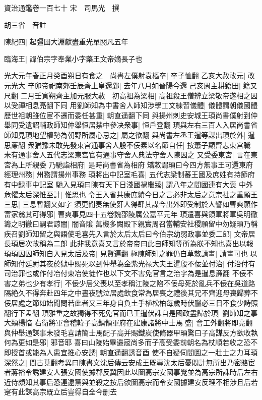 資治通鑑卷一百七十
宋　司馬光　撰

胡三省　音註

陳紀四|{
	起彊圉大淵獻盡重光單閼凡五年}


臨海王|{
	諱伯宗字奉業小字藥王文帝嫡長子也}


光大元年春正月癸酉朔日有食之　尚書左僕射袁樞卒|{
	卒子恤翻}
乙亥大赦改元|{
	改元光大}
辛卯帝祀南郊壬辰齊上皇還鄴|{
	去年八月如晉陽今還}
己亥周主耕籍田|{
	籍又尺翻}
二月壬寅朔齊主加元服大赦　初高祖為梁相|{
	高祖殺王僧辨立梁敬帝遂相之因以受禪相息亮翻下同}
用劉師知為中書舍人師知涉學工文練習儀體|{
	儀體謂朝儀國體}
歷世祖朝雖位宦不遷而委任甚重|{
	朝直遥翻下同}
與揚州刺史安城王頊尚書僕射到仲舉同受遺詔輔政師知仲舉恒居禁中參决衆事|{
	恒戶登翻}
頊與左右三百人入居尚書省師知見頊地望權勢為朝野所屬心忌之|{
	屬之欲翻}
與尚書左丞王暹等謀出頊於外|{
	暹思亷翻}
衆猶豫未敢先發東宫通事舍人殷不佞素以名節自任|{
	按蕭子顯齊志東宫職未有通事舍人五代志梁東宫官有通事守舍人典法守舍人陳因之}
又受委東宮|{
	言在東宮為上所親委}
乃馳詣相府|{
	是時尚書省為相府}
矯敕謂頊曰今四方無事王可還東府經理州務|{
	州務謂揚州事務}
頊將出中記室毛喜|{
	五代志梁制蕃王國及庶姓有持節府有中録事中記室}
馳入見頊曰陳有天下日淺國禍繼臻|{
	謂八年之間國連有大喪}
中外危懼太后深惟至計|{
	惟思也}
令王入省共康庶績今日之言必非太后之意宗社之重願王三思|{
	三息暫翻又如字}
須更聞奏無使姧人得肆其謀今出外即受制於人譬如曹爽願作富家翁其可得邪|{
	曹爽事見四十五卷魏邵陵厲公嘉平元年}
頊遣喜與領軍將軍吳明徹籌之明徹曰嗣君諒闇|{
	闇音隂}
萬機多闕殿下親實周召當輔安社稷願留中勿疑頊乃稱疾召劉師知留之與語使毛喜先入言於太后太后曰今伯宗幼弱政事並委二郎|{
	文帝居長頊居次故稱為二郎}
此非我意喜又言於帝帝曰此自師知等所為朕不知也喜出以報頊頊因囚師知自入見太后及帝|{
	見賢遍翻}
極陳師知之罪仍自草敕請畫|{
	請畫可也}
以師知付廷尉其夜於獄中賜死以到仲舉為金紫光禄大夫王暹殷不佞並付治|{
	付治付有司治罪也或作付冶付東冶使徒作也以下文不害免官言之治字為是暹息亷翻}
不佞不害之弟也少有孝行|{
	不佞少居父喪以至孝稱江陵之陷不佞母死於亂兵不佞在吳道路隔絶久不得奔赴四年之中晝夜號泣居處飲食常為居喪之禮後其兄不齊迎母喪歸葬不佞居處之節如始聞問若此者又三年身自負土手植松柏每歲時伏臘必三日不食少詩照翻行下孟翻}
頊雅重之故獨得不死免官而已王暹伏誅自是國政盡歸於頊|{
	劉師知之事大類楊愔}
右衛將軍會稽韓子高鎮領軍府在建康諸將中士馬盛|{
	會工外翻將即亮翻}
與仲舉通謀事未發毛喜請簡士馬配子高并賜鐵炭使脩器甲頊驚曰子高謀反方欲收執何為更如是邪|{
	邪音耶}
喜曰山陵始畢邉宼尚多而子高受委前朝名為杖順若收之恐不即授首或能為人患宜推心安誘|{
	朝直遥翻誘音酉}
使不自疑伺間圖之一壯士之力耳頊深然之|{
	間古莧翻考異曰陳書文沈后傳云安成王既專沈太后憂悶計無所出乃密賂宦者蔣裕令誘建安人張安國使據郡反冀因此以圖高宗安國事覺並為高宗所誅時后左右近侍頗知其事后恐連逮黨與並殺之按后欲圖高宗而令安國據建安反理不相涉且后若寔有此謀高宗既立后豈得自全今删去}
